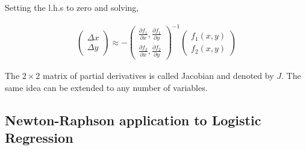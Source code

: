\documentclass[11pt, a4paper]{article}
\begin{document}
Setting the l.h.s to zero and solving,

\begin{align*}
\begin{pmatrix} \Delta x \\ \Delta y \end{pmatrix}  \approx -\begin{pmatrix} \frac{\partial f_1}{\partial x}, \frac{\partial f_1}{\partial y} \\ \frac{\partial f_2}{\partial x}, \frac{\partial f_2}{\partial y}\end{pmatrix}^{-1} \begin{pmatrix} f_1(x, y) \\ f_2(x, y) \end{pmatrix}
\end{align*}

The $2\times2$ matrix of partial derivatives is called Jacobian and denoted by $J$. The same idea can be extended to any number of variables.

\subsection{Newton-Raphson application to Logistic Regression}
\end{document}
